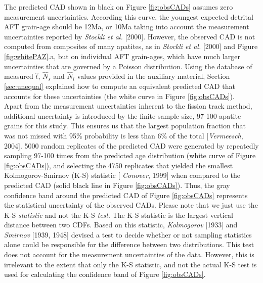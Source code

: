 \documentclass[12pt,twoside]{article}
\begin{document}
The predicted  CAD shown in black on  Figure \ref{fig:obsCADs} assumes
zero  measurement uncertainties.  According  this curve,  the youngest
expected detrital  AFT grain-age should  be 12Ma, or 10Ma  taking into
account the measurement uncertainties reported by {\it Stockli et al.}
[2000].  However, the observed CAD  is not computed from composites of
many  apatites,  as  in  {\it  Stockli  et  al.}   [2000]  and  Figure
\ref{fig:whitePAZ}.a,  but on  individual AFT  grain-ages,  which have
much larger uncertainties that are governed by a Poisson distribution.
Using the database of  measured $\hat{t}$, $\hat{N}_s$ and $\hat{N}_i$
values provided  in the auxiliary  material, Section \ref{sec:unequal}
explained how to compute an equivalent predicted CAD that accounts for
these uncertainties (the white curve in Figure \ref{fig:obsCADs}).
\\

Apart from the measurement uncertainties inherent to the fission track
method,  additional uncertainty  is  introduced by  the finite  sample
size, 97-100 apatite  grains for this study. This  ensures us that the
largest population fraction that  was not missed with 95\% probability
is less  than 6\% of the  total [{\it Vermeesch},  2004].  5000 random
replicates of the predicted  CAD were generated by repeatedly sampling
97-100  times from  the  predicted age  distribution  (white curve  of
Figure  \ref{fig:obsCADs}),  and selecting  the  4750 replicates  that
yielded   the  smallest   Kolmogorov-Smirnov  (K-S)   statistic  [{\it
  Conover}, 1999] when compared to the predicted CAD (solid black line
in Figure  \ref{fig:obsCADs}).  Thus, the gray  confidence band around
the   predicted  CAD  of   Figure  \ref{fig:obsCADs}   represents  the
statistical uncertainty of the observed CADs. Please note that we just
use  the K-S  {\it statistic}  and not  the K-S  {\it test}.   The K-S
statistic is the largest vertical distance between two CDFs.  Based on
this statistic, {\it Kolmogorov} [1933] and {\it Smirnov} [1939, 1948]
devised  a test  to decide  whether or  not sampling  statistics alone
could  be responsible for  the difference  between two  distributions. 
This test  does not account  for the measurement uncertainties  of the
data.  However,  this is  irrelevant to the  extent that only  the K-S
statistic, and  not the  actual K-S test  is used for  calculating the
confidence band of Figure \ref{fig:obsCADs}.
\\
\end{document}
